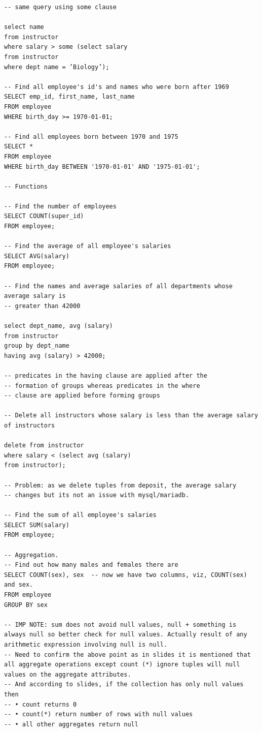 \documentclass[8pt, a4paper, oneside, twocolumn]{extarticle}
\begin{document}
\begin{verbatim}
-- same query using some clause

select name
from instructor
where salary > some (select salary
from instructor
where dept name = ’Biology’);

-- Find all employee's id's and names who were born after 1969
SELECT emp_id, first_name, last_name
FROM employee
WHERE birth_day >= 1970-01-01;

-- Find all employees born between 1970 and 1975
SELECT *
FROM employee
WHERE birth_day BETWEEN '1970-01-01' AND '1975-01-01';

-- Functions

-- Find the number of employees
SELECT COUNT(super_id)
FROM employee;

-- Find the average of all employee's salaries
SELECT AVG(salary)
FROM employee;

-- Find the names and average salaries of all departments whose average salary is
-- greater than 42000

select dept_name, avg (salary)
from instructor
group by dept_name
having avg (salary) > 42000;

-- predicates in the having clause are applied after the
-- formation of groups whereas predicates in the where
-- clause are applied before forming groups

-- Delete all instructors whose salary is less than the average salary of instructors

delete from instructor
where salary < (select avg (salary)
from instructor);

-- Problem: as we delete tuples from deposit, the average salary
-- changes but its not an issue with mysql/mariadb.

-- Find the sum of all employee's salaries
SELECT SUM(salary)
FROM employee;

-- Aggregation.
-- Find out how many males and females there are
SELECT COUNT(sex), sex  -- now we have two columns, viz, COUNT(sex) and sex.
FROM employee
GROUP BY sex

-- IMP NOTE: sum does not avoid null values, null + something is always null so better check for null values. Actually result of any arithmetic expression involving null is null.
-- Need to confirm the above point as in slides it is mentioned that all aggregate operations except count (*) ignore tuples will null values on the aggregate attributes.
-- And according to slides, if the collection has only null values then 
-- • count returns 0
-- • count(*) return number of rows with null values
-- • all other aggregates return null


\end{verbatim}
\end{document}
